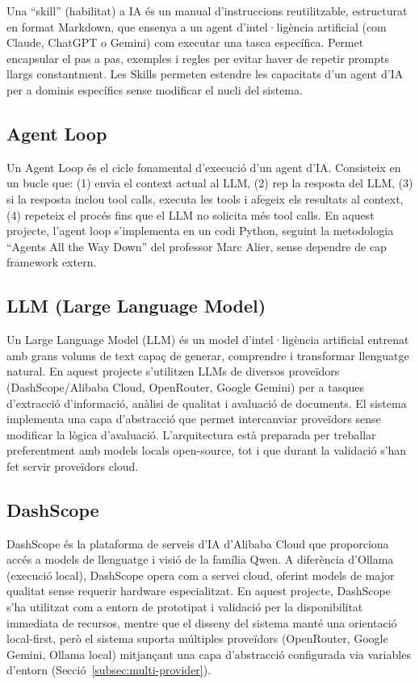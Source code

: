 \documentclass[12pt,a4paper,twoside]{report}
\begin{document}
Una ``skill'' (habilitat) a IA \'es un manual d'instruccions reutilitzable, estructurat en format Markdown, que ensenya a un agent d'intel·lig\`encia artificial (com Claude, ChatGPT o Gemini) com executar una tasca espec\'ifica. Permet encapsular el pas a pas, exemples i regles per evitar haver de repetir prompts llargs constantment. Les Skills permeten estendre les capacitats d'un agent d'IA per a dominis espec\'ifics sense modificar el nucli del sistema.

\subsection{Agent Loop}
\label{subsec:agent-loop}

Un Agent Loop \'es el cicle fonamental d'execuci\'o d'un agent d'IA. Consisteix en un bucle que: (1) envia el context actual al LLM, (2) rep la resposta del LLM, (3) si la resposta inclou tool calls, executa les tools i afegeix els resultats al context, (4) repeteix el proc\'es fins que el LLM no solicita m\'es tool calls. En aquest projecte, l'agent loop s'implementa en un codi Python, seguint la metodologia ``Agents All the Way Down'' del professor Marc Alier, sense dependre de cap framework extern.

\subsection{LLM (Large Language Model)}
\label{subsec:llm}

Un Large Language Model (LLM) \'es un model d'intel·lig\`encia artificial entrenat amb grans volums de text capa\c{c} de generar, comprendre i transformar llenguatge natural. En aquest projecte s'utilitzen LLMs de diversos prove\"idors (DashScope/Alibaba Cloud, OpenRouter, Google Gemini) per a tasques d'extracci\'o d'informaci\'o, an\`alisi de qualitat i avaluaci\'o de documents. El sistema implementa una capa d'abstracci\'o que permet intercanviar prove\"idors sense modificar la l\`ogica d'avaluaci\'o. L’arquitectura està preparada per treballar preferentment amb models locals open-source, tot i que durant la validació s’han fet servir proveïdors cloud.

\subsection{DashScope}

DashScope \'es la plataforma de serveis d'IA d'Alibaba Cloud que proporciona acc\'es a models de llenguatge i visi\'o de la fam\'ilia Qwen. A difer\`encia d'Ollama (execuci\'o local), DashScope opera com a servei cloud, oferint models de major qualitat sense requerir hardware especialitzat. En aquest projecte, DashScope s’ha utilitzat com a entorn de prototipat i validació per la disponibilitat immediata de recursos, mentre que el disseny del sistema manté una orientació local-first, per\`o el sistema suporta m\'ultiples prove\"idors (OpenRouter, Google Gemini, Ollama local) mitjan\c{c}ant una capa d'abstracci\'o configurada via variables d'entorn (Secci\'o~\ref{subsec:multi-provider}).
\end{document}
